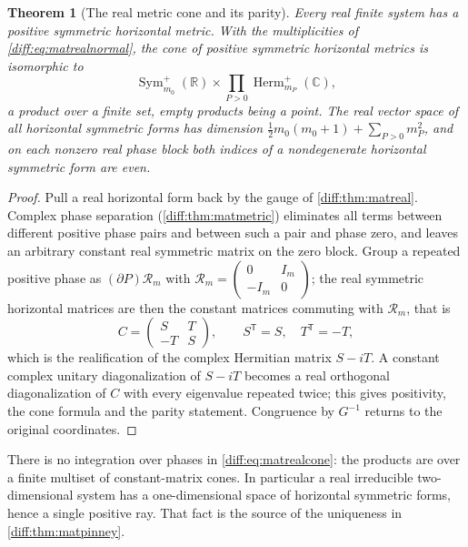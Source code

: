 \documentclass[11pt,letterpaper]{article}
\numberwithin{equation}{section}
\newtheorem{theorem}{Theorem}[section]
\theoremstyle{definition}
\theoremstyle{remark}
\newcommand{\R}{\mathbb R}
\newcommand{\C}{\mathbb C}
\newcommand{\der}{\partial}
\newcommand{\Herm}{\operatorname{Herm}}
\newcommand{\Symm}{\operatorname{Sym}}
\newcommand{\Rot}{\mathcal R}
\begin{document}
\begin{theorem}[The real metric cone and its parity]
\label{diff:thm:matrealmetric}
Every real finite system has a positive symmetric horizontal metric. With the
multiplicities of \cref{diff:eq:matrealnormal}, the cone of positive symmetric
horizontal metrics is isomorphic to
\begin{equation}\label{diff:eq:matrealcone}
 \Symm^{+}_{m_{0}}(\R)\times\prod_{P>0}\Herm^{+}_{m_{P}}(\C),
\end{equation}
a product over a finite set, empty products being a point. The real vector
space of all horizontal symmetric forms has dimension
$\tfrac12 m_{0}(m_{0}+1)+\sum_{P>0}m_{P}^{2}$, and on each nonzero real phase
block both indices of a nondegenerate horizontal symmetric form are even.
\end{theorem}
\begin{proof}
Pull a real horizontal form back by the gauge of \cref{diff:thm:matreal}.
Complex phase separation (\cref{diff:thm:matmetric}) eliminates all terms
between different positive phase pairs and between such a pair and phase zero,
and leaves an arbitrary constant real symmetric matrix on the zero block.
Group a repeated positive phase as $(\der P)\Rot_{m}$ with
$\Rot_{m}=\left(\begin{smallmatrix}0&I_{m}\\-I_{m}&0\end{smallmatrix}\right)$;
the real symmetric horizontal matrices are then the constant matrices
commuting with $\Rot_{m}$, that is
\[
 C=\begin{pmatrix}S&T\\-T&S\end{pmatrix},
 \qquad S^{\mathsf T}=S,\quad T^{\mathsf T}=-T ,
\]
which is the realification of the complex Hermitian matrix $S-iT$. A constant
complex unitary diagonalization of $S-iT$ becomes a real orthogonal
diagonalization of $C$ with every eigenvalue repeated twice; this gives
positivity, the cone formula and the parity statement. Congruence by $G^{-1}$
returns to the original coordinates.
\end{proof}

There is no integration over phases in \cref{diff:eq:matrealcone}: the
products are over a finite multiset of constant-matrix cones. In particular a
real irreducible two-dimensional system has a one-dimensional space of
horizontal symmetric forms, hence a single positive ray. That fact is the
source of the uniqueness in \cref{diff:thm:matpinney}.
\end{document}
